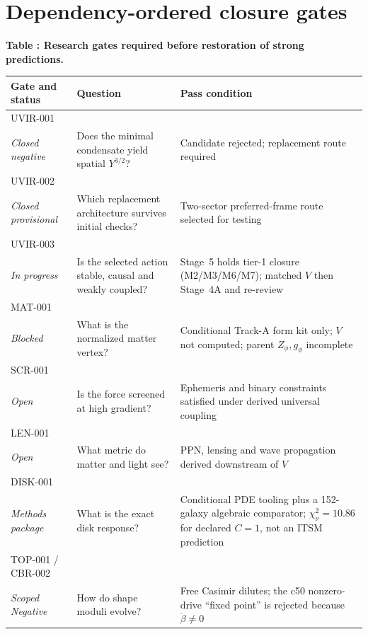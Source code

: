 \clearpage
\section{Dependency-ordered closure gates}

\begin{center}
\small
\textbf{Table \thetable: Research gates required before restoration of strong predictions.}\par\smallskip
\begin{tabular}{@{}p{}p{}p{}@{}}
\toprule
Gate and status & Question & Pass condition \\
\midrule
UVIR-001\\\textit{Closed negative} & Does the minimal condensate yield spatial $Y^{3/2}$? & Candidate rejected; replacement route required \\
UVIR-002\\\textit{Closed provisional} & Which replacement architecture survives initial checks? & Two-sector preferred-frame route selected for testing \\
UVIR-003\\\textit{In progress} & Is the selected action stable, causal and weakly coupled? & Stage~5 holds tier-1 closure (M2/M3/M6/M7); matched $V$ then Stage~4A and re-review \\
MAT-001\\\textit{Blocked} & What is the normalized matter vertex? & Conditional Track-A form kit only; $V$ not computed; parent $Z_\phi,g_\phi$ incomplete \\
SCR-001\\\textit{Open} & Is the force screened at high gradient? & Ephemeris and binary constraints satisfied under derived universal coupling \\
LEN-001\\\textit{Open} & What metric do matter and light see? & PPN, lensing and wave propagation derived downstream of $V$ \\
DISK-001\\\textit{Methods package} & What is the exact disk response? & Conditional PDE tooling plus a 152-galaxy algebraic comparator; $\chi_\nu^2=10.86$ for declared $C=1$, not an ITSM prediction \\
TOP-001 / CBR-002\\\textit{Scoped Negative} & How do shape moduli evolve? & Free Casimir dilutes; the c50 nonzero-drive ``fixed point'' is rejected because $\dot\beta\ne0$ \\

\end{tabular}
\end{center}
